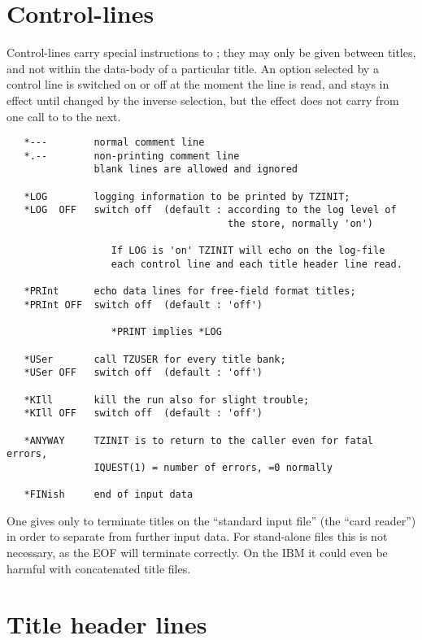 \newpage
{}
\section{Control-lines}
\label{sec:tzcontrollines}

Control-lines carry special instructions to ;
they may only be given between titles,
and not within the data-body of a particular title.
An option selected by a control line is switched on or off
at the moment the line is read, and stays in effect until
changed by the inverse selection,
but the effect does not carry from one call to  to the next.

\begin{verbatim}
   *---        normal comment line
   *.--        non-printing comment line
               blank lines are allowed and ignored

   *LOG        logging information to be printed by TZINIT;
   *LOG  OFF   switch off  (default : according to the log level of
                                      the store, normally 'on')

                  If LOG is 'on' TZINIT will echo on the log-file
                  each control line and each title header line read.

   *PRInt      echo data lines for free-field format titles;
   *PRInt OFF  switch off  (default : 'off')

                  *PRINT implies *LOG

   *USer       call TZUSER for every title bank;
   *USer OFF   switch off  (default : 'off')

   *KIll       kill the run also for slight trouble;
   *KIll OFF   switch off  (default : 'off')

   *ANYWAY     TZINIT is to return to the caller even for fatal errors,
               IQUEST(1) = number of errors, =0 normally

   *FINish     end of input data
\end{verbatim} 

One gives  only to terminate titles on
the ``standard input file'' (the ``card reader'') in order to
separate from further input data.
For stand-alone files this is not necessary, as the EOF will
terminate correctly.
On the IBM it could even be harmful with concatenated title files.

\newpage
{}
\section{Title header lines}
\label{sec:TZ-titleheaderlines}

